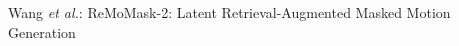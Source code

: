 \documentclass[10pt,journal,compsoc]{IEEEtran}
\begin{document}
% 
%

%
{Wang \MakeLowercase{\textit{et al.}}: ReMoMask-2: Latent Retrieval-Augmented Masked Motion Generation}
% 



\end{document}

